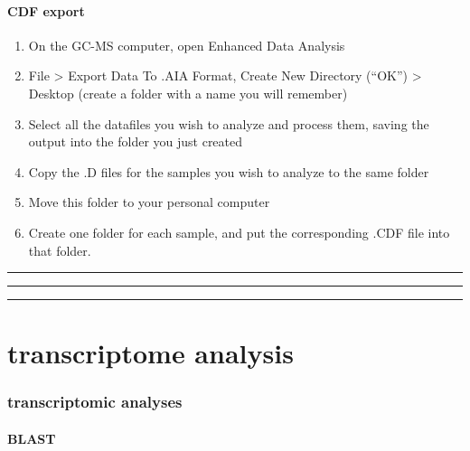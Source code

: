 \documentclass[
]{krantz}
\providecommand{\tightlist}{%
  \setlength{\itemsep}{0pt}\setlength{\parskip}{0pt}}
\begin{document}
\hypertarget{cdf-export}{%
\subsection{CDF export}\label{cdf-export}}

\begin{enumerate}
\def\labelenumi{\arabic{enumi}.}
\tightlist
\item
  On the GC-MS computer, open Enhanced Data Analysis
\item
  File \textgreater{} Export Data To .AIA Format, Create New Directory (``OK'') \textgreater{} Desktop (create a folder with a name you will remember)
\item
  Select all the datafiles you wish to analyze and process them, saving the output into the folder you just created
\item
  Copy the .D files for the samples you wish to analyze to the same folder
\item
  Move this folder to your personal computer
\item
  Create one folder for each sample, and put the corresponding .CDF file into that folder.
\end{enumerate}

\begin{center}\rule{0.5\linewidth}{0.5pt}\end{center}

\begin{center}\rule{0.5\linewidth}{0.5pt}\end{center}

\begin{center}\rule{0.5\linewidth}{0.5pt}\end{center}

\hypertarget{part-transcriptome-analysis}{%
\part{transcriptome analysis}\label{part-transcriptome-analysis}}

\hypertarget{transcriptomic-analyses}{%
\section{transcriptomic analyses}\label{transcriptomic-analyses}}

\hypertarget{blast}{%
\subsection{BLAST}\label{blast}}
\end{document}
